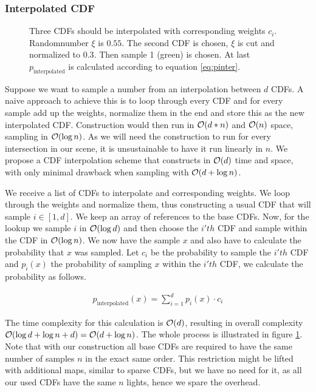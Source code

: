 \subsubsection{Interpolated CDF}
\label{sec:intcdf}
\begin{figure}[htb] 
	\centering
    
    \caption{Three CDFs should be interpolated with corresponding weights $c_i$. Randomnumber $\xi$ is $0.55$. The second CDF is chosen, $\xi$ is cut and normalized to $0.3$. Then sample 1 (green) is chosen. At last $p_{\text{interpolated}}$ is calculated according to equation \ref{eq:pinter}.} 
    \label{fig:interpolatedCDF}
\end{figure}

Suppose we want to sample a number from an interpolation between $d$ CDFs. A naive approach to achieve this is to loop through every CDF and for every sample add up the weights, normalize them in the end and store this as the new interpolated CDF. Construction would then run in $\mathcal{O}(d * n)$ and $\mathcal{O}(n)$ space, sampling in $\mathcal{O}(\log{n})$. As we will need the construction to run for every intersection in our scene, it is unsustainable to have it run linearly in $n$. We propose a CDF interpolation scheme that constructs in $\mathcal{O}(d)$ time and space, with only minimal drawback when sampling with $\mathcal{O}(d + \log{n})$.

We receive a list of CDFs to interpolate and corresponding weights. We loop through the weights and normalize them, thus constructing a usual CDF that will sample $i \in [1,d]$. We keep an array of references to the base CDFs. Now, for the lookup we sample $i$ in $\mathcal{O}(\log{d})$ and then choose the $i'th$ CDF and sample within the CDF in $\mathcal{O}(\log{n})$. We now have the sample $x$ and also have to calculate the probability that $x$ was sampled. Let $c_i$ be the probability to sample the $i'th$ CDF and $p_i(x)$ the probability of sampling $x$ within the $i'th$ CDF, we calculate the probability as follows.

\begin{align}\label{eq:pinter}
    p_{\text{interpolated}}(x) = \sum_{i=1}^{d}p_{i}(x) \cdot c_i
\end{align}

The time complexity for this calculation is $\mathcal{O}(d)$, resulting in overall complexity $\mathcal{O}(\log{d} + \log{n} + d) = \mathcal{O}(d + \log{n})$. The whole process is illustrated in figure \ref{fig:interpolatedCDF}. Note that with our construction all base CDFs are required to have the same number of samples $n$ in the exact same order. This restriction might be lifted with additional maps, similar to sparse CDFs, but we have no need for it, as all our used CDFs have the same $n$ lights, hence we spare the overhead.

